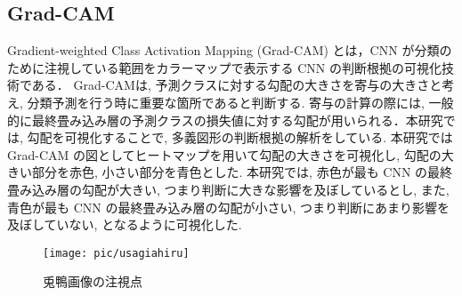 \documentclass[twocolumn]{jarticle}     %
\newcommand{\1}{\mbox{1}\hspace{-0.25em}\mbox{l}}
\begin{document}
\subsection{Grad-CAM}
Gradient-weighted Class Activation Mapping (Grad-CAM) \cite{Selvaraju_2017_ICCV} とは，CNN が分類のために注視している範囲をカラーマップで表示する CNN の判断根拠の可視化技術である．
Grad-CAMは, 予測クラスに対する勾配の大きさを寄与の大きさと考え, 分類予測を行う時に重要な箇所であると判断する. 寄与の計算の際には, 一般的に最終畳み込み層の予測クラスの損失値に対する勾配が用いられる．本研究では, 勾配を可視化することで, 多義図形の判断根拠の解析をしている. 
本研究では Grad-CAM の図としてヒートマップを用いて勾配の大きさを可視化し, 勾配の大きい部分を赤色, 小さい部分を青色とした.
本研究では, 赤色が最も CNN の最終畳み込み層の勾配が大きい, つまり判断に大きな影響を及ぼしているとし, また, 青色が最も CNN の最終畳み込み層の勾配が小さい, つまり判断にあまり影響を及ぼしていない, となるように可視化した.
\begin{figure}[t]
	\centering
	\texttt{[image: pic/usagiahiru]}
	\caption{兎鴨画像の注視点}
	\label{fig:usagiahiru}
\end{figure}
\end{document}
